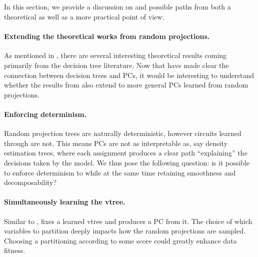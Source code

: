 \subsection{}

In this section, we provide a discussion on  and possible paths from both a
theoretical as well as a more practical point of view.

\paragraph{Extending the theoretical works from random projections.} As mentioned in ,
there are several interesting theoretical results coming primarily from the decision tree
literature. Now that \citet{correia20} have made clear the connection between decision trees and
PCs, it would be interesting to understand whether the results from \citet{dasgupta08b} also extend
to more general PCs learned from random projections.

\paragraph{Enforcing determinism.} Random projection trees are naturally deterministic, however
circuits learned through  are not. This means  PCs are not as
interpretable as, say density estimation trees, where each assignment produces a clear path
``explaining'' the decisions taken by the model. We thus pose the following question: is it
possible to enforce determinism to  while at the same time retaining smoothness
and decomposability?

\paragraph{Simultaneously learning the vtree.} Similar to , 
fixes a learned vtree and produces a PC from it. The choice of which variables to partition deeply
impacts how the random projections are sampled. Choosing a partitioning according to some score
could greatly enhance data fitness.

